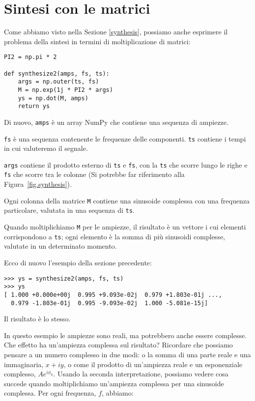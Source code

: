 \documentclass[12pt]{book} \usepackage[width=5.5in,height=8.5in, hmarginratio=3:2,vmarginratio=1:1]{geometry}
\begin{document}
\section{Sintesi con le matrici} \label{synthmat} 

Come abbiamo visto nella Sezione \ref{synthesis}, possiamo anche esprimere il problema della sintesi in termini di moltiplicazione di matrici:

\begin{verbatim} 
PI2 = np.pi * 2

def synthesize2(amps, fs, ts):
    args = np.outer(ts, fs)
    M = np.exp(1j * PI2 * args)
    ys = np.dot(M, amps)
    return ys
 \end{verbatim} 

Di nuovo, {\tt amps} è un array NumPy che contiene una sequenza di ampiezze.

{\tt fs} è una sequenza contenente le frequenze delle componenti. {\tt ts} contiene i tempi in cui valuteremo il segnale.

{\tt args} contiene il prodotto esterno di {\tt ts} e {\tt fs}, con la {\tt ts} che scorre lungo le righe e {\tt fs} che scorre tra le colonne (Si potrebbe far riferimento alla Figura~\ref{fig.synthesis}).

Ogni colonna della matrice {\tt M} contiene una sinusoide complessa con una frequenza particolare, valutata in una sequenza di {\tt ts}.

Quando moltiplichiamo {\tt M} per le ampiezze, il risultato è un vettore i cui elementi corrispondono a {\tt ts}; ogni elemento è la somma di più sinusoidi complesse, valutate in un determinato momento.

Ecco di nuovo l'esempio della sezione precedente:

\begin{verbatim} 
>>> ys = synthesize2(amps, fs, ts)
>>> ys
[ 1.000 +0.000e+00j  0.995 +9.093e-02j  0.979 +1.803e-01j ...,
  0.979 -1.803e-01j  0.995 -9.093e-02j  1.000 -5.081e-15j]
 \end{verbatim} 

Il risultato è lo stesso.

In questo esempio le ampiezze sono reali, ma potrebbero anche essere complesse. Che effetto ha un'ampiezza complessa sul risultato? Ricordare che possiamo pensare a un numero complesso in due modi: o la somma di una parte reale e una immaginaria, $x + i y$, o come il prodotto di un'ampiezza reale e un esponenziale complesso, $A e^{i \phi_0}$. Usando la seconda interpretazione, possiamo vedere cosa succede quando moltiplichiamo un'ampiezza complessa per una sinusoide complessa. Per ogni frequenza, $f$, abbiamo:
\end{document}
